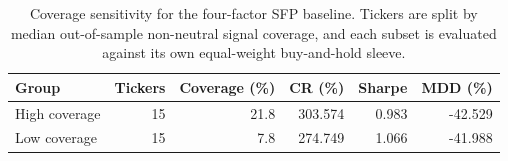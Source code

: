 \begin{table}[htbp]
\centering
\caption{Coverage sensitivity for the four-factor SFP baseline. Tickers are split by median out-of-sample non-neutral signal coverage, and each subset is evaluated against its own equal-weight buy-and-hold sleeve.}
\label{tab:semantic_coverage_sensitivity}
\begin{tabular}{lrrrrr}
\toprule
\textbf{Group} & \textbf{Tickers} & \textbf{Coverage (\%)} & \textbf{CR (\%)} & \textbf{Sharpe} & \textbf{MDD (\%)} \\
\midrule
High coverage & 15 & 21.8 & 303.574 & 0.983 & -42.529 \\
Low coverage & 15 & 7.8 & 274.749 & 1.066 & -41.988 \\
\bottomrule
\end{tabular}
\end{table}
